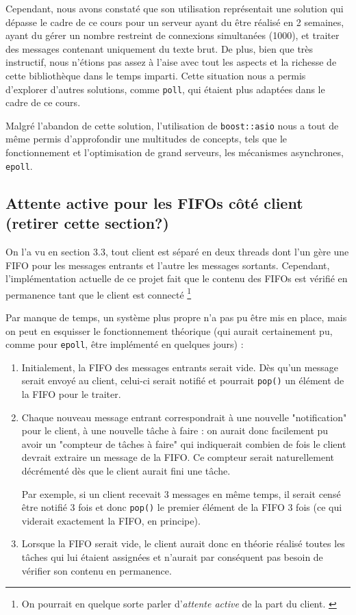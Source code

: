 \documentclass{article}
\begin{document}
\noindent Cependant, nous avons constaté que son utilisation représentait une solution qui dépasse le cadre de ce cours pour un serveur ayant du être réalisé en 2 semaines, ayant du gérer un nombre restreint de connexions simultanées (1000), et traiter des messages contenant uniquement du texte brut. De plus, bien que très instructif, nous n’étions pas assez à l’aise avec tout les aspects et la richesse de cette bibliothèque dans le temps imparti. Cette situation nous a permis d'explorer d’autres solutions, comme \texttt{poll}, qui étaient plus adaptées dans le cadre de ce cours.

\noindent Malgré l'abandon de cette solution, l’utilisation de \texttt{boost::asio} nous a tout de même permis d'approfondir une multitudes de concepts, tels que le fonctionnement et l'optimisation de grand serveurs, les mécanismes asynchrones, \texttt{epoll}.


\subsection{Attente active pour les FIFOs côté client (retirer cette section?)}
\noindent On l'a vu en section 3.3, tout client est séparé en deux threads dont l'un gère une FIFO pour les messages entrants et l'autre les messages sortants. Cependant, l'implémentation actuelle de ce projet fait que le contenu des FIFOs est vérifié en permanence tant que le client est connecté \footnote{On pourrait en quelque sorte parler d'\textit{attente active} de la part du client. \cite{Attente Active} }

\noindent Par manque de temps, un système plus propre n'a pas pu être mis en place, mais on peut en esquisser le fonctionnement théorique (qui aurait certainement pu, comme pour \texttt{epoll}, être implémenté en quelques jours) :
\begin{enumerate}
    \item Initialement, la FIFO des messages entrants serait vide. Dès qu'un message serait envoyé au client, celui-ci serait notifié et pourrait \texttt{pop()} un élément de la FIFO pour le traiter.
    \item Chaque nouveau message entrant correspondrait à une nouvelle "notification" pour le client, à une nouvelle tâche à faire : on aurait donc facilement pu avoir un "compteur de tâches à faire" qui indiquerait combien de fois le client devrait extraire un message de la FIFO. Ce compteur serait naturellement décrémenté dès que le client aurait fini une tâche.

    Par exemple, si un client recevait 3 messages en même temps, il serait censé être notifié 3 fois et donc \texttt{pop()} le premier élément de la FIFO 3 fois (ce qui viderait exactement la FIFO, en principe).
    \item Lorsque la FIFO serait vide, le client aurait donc en théorie réalisé toutes les tâches qui lui étaient assignées et n'aurait par conséquent pas besoin de vérifier son contenu en permanence.
\end{enumerate}
\end{document}
